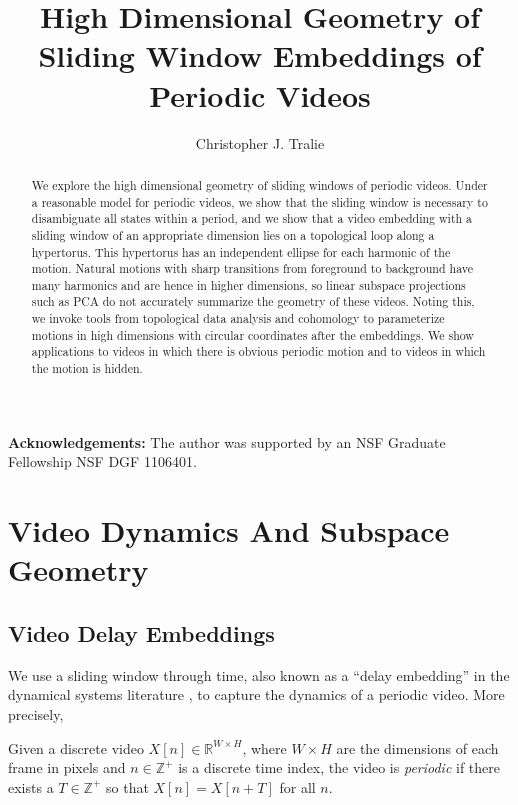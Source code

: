 \documentclass[a4paper,UKenglish]{lipics-v2016}
\title{High Dimensional Geometry of Sliding Window Embeddings of Periodic Videos}
\author[1]{Christopher J. Tralie}
\affil[1]{Department of Electrical and Computer Engineering, Duke University\\
  Durham, NC USA
  \texttt{chris.tralie@gmail.com}}
\begin{document}
\maketitle

\begin{abstract}
We explore the high dimensional geometry of sliding windows of periodic videos. Under a reasonable model for periodic videos, we show that the sliding window is necessary to disambiguate all states within a period, and we show that a video embedding with a sliding window of an appropriate dimension lies on a topological loop along a hypertorus.  This hypertorus has an independent ellipse for each harmonic of the motion.  Natural motions with sharp transitions from foreground to background have many harmonics and are hence in higher dimensions, so linear subspace projections such as PCA do not accurately summarize the geometry of these videos.  Noting this, we invoke tools from topological data analysis and cohomology to parameterize motions in high dimensions with circular coordinates after the embeddings.  We show applications to videos in which there is obvious periodic motion and to videos in which the motion is hidden.
\end{abstract}

\noindent \textbf{Acknowledgements:}  The author was supported by an NSF Graduate Fellowship NSF DGF 1106401.

\section{Video Dynamics And Subspace Geometry}



\subsection{Video Delay Embeddings}
We use a sliding window through time, also known as a ``delay embedding'' in the dynamical systems literature \cite{kantz2004nonlinear}, to capture the dynamics of a periodic video.  More precisely, 

\begin{definition}
Given a discrete video $X[n] \in \mathbb{R}^{W \times H}$, where $W \times H$ are the dimensions of each frame in pixels and $n \in \mathbb{Z}^+$ is a discrete time index, the video is {\em periodic} if there exists a $T \in \mathbb{Z}^+$ so that $X[n] = X[n + T]$ for all $n$.
\end{definition}
\end{document}
